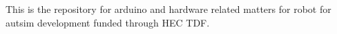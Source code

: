 This is the repository for arduino and hardware related matters for robot for autsim development funded through H\+EC T\+DF. 